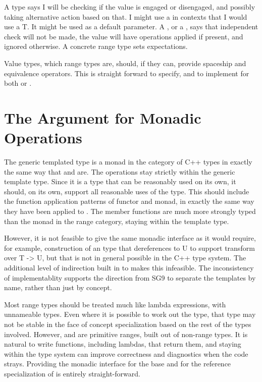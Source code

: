 \documentclass[a4paper,10pt,oneside,openany,final,article]{memoir}
\begin{document}
A  type says I will be checking if the value is engaged or disengaged, and possibly taking alternative action based on that. I might use a  in contexts that I would use a T. It might be used as a default parameter. A , or a , says that independent check will not be made, the value will have operations applied if present, and ignored otherwise. A concrete range type sets expectations.

Value types, which range types are, should, if they can, provide spaceship and equivalence operators. This is straight forward to specify, and to implement for both  or .

\section{The Argument for Monadic Operations}
The generic templated type  is a monad in the category of C++ types in exactly the same way that  and  are. \cite{P0798R8} The operations stay strictly within the generic template type. Since it is a type that can be reasonably used on its own, it should, on its own, support all reasonable uses of the type. This should include the function application patterns of functor and monad, in exactly the same way they have been applied to . The member functions are much more strongly typed than the monad in the range category, staying within the template type.

However, it is not feasible to give  the same monadic interface as it would require, for example,  construction of an type that dereferences to U to support transform over T -> U, but that is not in general possible in the C++ type system. The additional level of indirection built in to  makes this infeasible. The inconsistency of implementablity supports the direction from SG9 to separate the templates by name, rather than just by concept.

Most range types should be treated much like lambda expressions, with unnameable types. Even where it is possible to work out the type, that type may not be stable in the face of concept specialization based on the rest of the types involved. However,  and  are primitive ranges, built out of non-range types. It is natural to write functions, including lambdas, that return them, and staying within the type system can improve correctness and diagnostics when the code strays. Providing the monadic interface for the base and for the reference specialization of  is entirely straight-forward.
\end{document}
